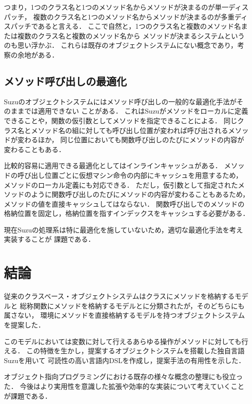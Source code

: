 \documentclass{ipsjprosym}
\begin{document}
つまり，1つのクラス名と1つのメソッド名からメソッドが決まるのが単一ディスパッチ，
複数のクラス名と1つのメソッド名からメソッドが決まるのが多重ディスパッチであると言える．
ここで自然と，1つのクラス名と複数のメソッド名または複数のクラス名と複数のメソッド名から
メソッドが決まるシステムというのも思い浮かぶ．
これらは既存のオブジェクトシステムにない概念であり，考察の余地がある．

\subsection{メソッド呼び出しの最適化}

Suzuのオブジェクトシステムにはメソッド呼び出しの一般的な最適化手法がそのままでは適用できない
ことがある．
これはSuzuがメソッドをローカルに定義できることや，関数の仮引数としてメソッドを指定できることによる．
同じクラス名とメソッド名の組に対しても呼び出し位置が変われば呼び出されるメソッドが変わるほか，
同じ位置においても関数呼び出しのたびにメソッドの内容が変わることもある．

比較的容易に適用できる最適化としてはインラインキャッシュ\cite{Onodera:1997-04-15}がある．
メソッドの呼び出し位置ごとに仮想マシン命令の内部にキャッシュを用意するため，
メソッドのローカル定義にも対応できる．
ただし，仮引数として指定されたメソッドのように関数呼び出しのたびにメソッドの内容が変わることもあるため，
メソッドの値を直接キャッシュしてはならない．
関数呼び出しでのメソッドの格納位置を固定し，格納位置を指すインデックスをキャッシュする必要がある．

現在Suzuの処理系は特に最適化を施していないため，適切な最適化手法を考え実装することが
課題である．

\section{結論}

従来のクラスベース・オブジェクトシステムはクラスにメソッドを格納するモデルと
総称関数にメソッドを格納するモデルとに分類されたが，そのどちらにも属さない，
環境にメソッドを直接格納するモデルを持つオブジェクトシステムを提案した．

このモデルにおいては変数に対して行えるあらゆる操作がメソッドに対しても行える．
この特徴を生かし，提案するオブジェクトシステムを搭載した独自言語Suzuを用いて
可読性の高い言語内DSLを作成し，提案手法の有用性を示した．

オブジェクト指向プログラミングにおける既存の様々な概念の整理にも役立った．
今後はより実用性を意識した拡張や効率的な実装について考えていくことが課題である．
\end{document}
